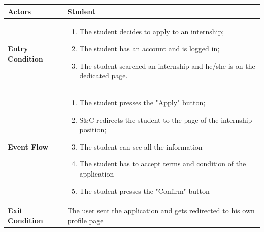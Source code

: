 \begin{enumerate}[label=\textbf{[US\arabic*]}, left = 0pt, align = left, resume]
\begin{longtable}{|l|p{11cm}|}
                \textbf{Actors} & 
                    Student \\
                \hline
                
                \textbf{Entry Condition} & 
                    \begin{enumerate}[label=\textbullet, itemsep=0em]
                        \item The student decides to apply to an internship;
                        \item The student has an account and is logged in;
                        \item The student searched an internship and he/she is on the dedicated page.
                    \end{enumerate} \\
                \hline
                
                \textbf{Event Flow} &
                    \begin{enumerate}[label=\arabic*., itemsep=0.2em]
                        \item The student presses the "Apply" button;
                        \item S\&C redirects the student to the page of the internship position;
                        \item The student can see all the information
                        \item The student has to accept terms and condition of the application
                        \item The student presses the "Confirm" button
                    \end{enumerate} \\
                \hline
                
                \textbf{Exit Condition} & 
                    The user sent the application and gets redirected to his own profile page\\
                \hline
                

\end{longtable}
\end{enumerate}
